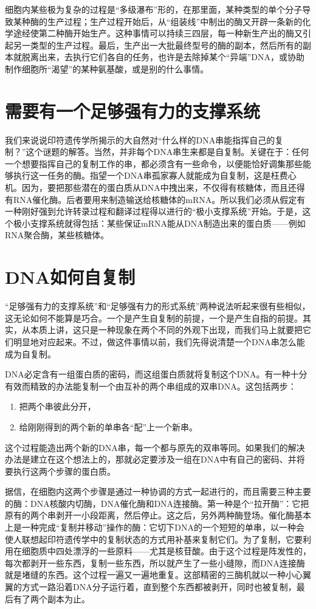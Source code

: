细胞内某些极为复杂的过程是“多级瀑布”形的，在那里面，某种类型的单个分子导致某种酶的生产过程；生产过程开始后，从“组装线”中制出的酶又开辟一条新的化学途经使第二种酶开始生产。这种事情可以持续三四层，每一种新生产出的酶又引起另一类型的生产过程。最后，生产出一大批最终型号的酶的副本，然后所有的副本就脱离出来，去执行它们各自的任务，也许是去除掉某个“异端”DNA，或协助制作细胞所“渴望”的某种氨基酸，或是别的什么事情。

\section{需要有一个足够强有力的支撑系统}

我们来说说印符遗传学所揭示的大自然对“什么样的DNA串能指挥自己的复制？”这个谜题的解答。当然，并非每个DNA串生来都是自复制。关键在于：任何一个想要指挥自己的复制工作的串，都必须含有一些命令，以便能恰好调集那些能够执行这一任务的酶。指望一个DNA串孤家寡人就能成为自复制，这是枉费心机。因为，要把那些潜在的蛋白质从DNA中拽出来，不仅得有核糖体，而且还得有RNA催化酶。后者要用来制造输送给核糖体的mRNA。所以我们必须从假定有一种刚好强到允许转录过程和翻译过程得以进行的“极小支撑系统”开始。于是，这个极小支撑系统就得包括：某些保证mRNA能从DNA制造出来的蛋白质——例如RNA聚合酶，某些核糖体。

\section{DNA如何自复制}

“足够强有力的支撑系统”和“足够强有力的形式系统”两种说法听起来很有些相似，这无论如何不能算是巧合。一个是产生自复制的前提，一个是产生自指的前提。其实，从本质上讲，这只是一种现象在两个不同的外观下出现，而我们马上就要把它们明显地对应起来。不过，做这件事情以前，我们先得说清楚一个DNA串怎么能成为自复制。

DNA必定含有一组蛋白质的密码，而这组蛋白质就将复制这个DNA。有一种十分有效而精致的办法能复制一个由互补的两个串组成的双串DNA。这包括两步：
\begin{enumerate}
\item 把两个串彼此分开，
\item 给刚刚得到的两个新的单串各“配”上一个新串。
\end{enumerate}
这个过程能造出两个新的DNA串，每一个都与原先的双串等同。如果我们的解决办法是建立在这个想法上的，那就必定要涉及一组在DNA中有自己的密码、并将要执行这两个步骤的蛋白质。

据信，在细胞内这两个步骤是通过一种协调的方式一起进行的，而且需要三种主要的酶：DNA核酸内切酶，DNA催化酶和DNA连接酶。第一种是个“拉开酶”：它把原有的两个串剥开一小段距离，然后停止。这之后，另外两种酶登场。催化酶基本上是一种完成“复制并移动”操作的酶：它切下DNA的一个短短的单串，以一种会使人联想起印符遗传学中的复制状态的方式用补基来复制它们。为了复制，它要利用在细胞质中四处漂浮的一些原料——尤其是核苷酸。由于这个过程是阵发性的，每次都剥开一些东西，复制一些东西，所以就产生了一些小缝隙，而DNA连接酶就是堵缝的东西。这个过程一遍又一遍地重复。这部精密的三酶机就以一种小心翼翼的方式一路沿着DNA分子运行着，直到整个东西都被剥开，同时也被复制，最后有了两个副本为止。

